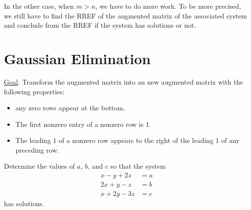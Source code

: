 \documentclass[12pt,a4paper]{article}
\newcounter{example}[section]
\begin{document}
In the other case, when $m > n$, we have to do more work. To be more precised, we still have to find the RREF of the augmented matrix of the associated system and conclude from the RREF if the system has solutions or not.

\newpage

\section{Gaussian Elimination}

\underline{Goal}. Transform the augmented matrix into an new augmented matrix with the following properties:
	\begin{itemize}
	\item any zero rows appear at the bottom.
	\item The first nonzero entry of a nonzero row is $1$.
	\item The leading $1$ of a nonzero row appears to the right of the leading 1 of any preceding row.
	\end{itemize}
	
	\vspace*{16pt}
	
	\begin{example}
	Determine the values of $a$, $b$, and $c$ so that the system
		\begin{align*}
		x - y + 2z &= a \\
		2x + y - z &= b \\
		x + 2y - 3z &= c
		\end{align*}
	has solutions.
	\end{example}
\end{document}
